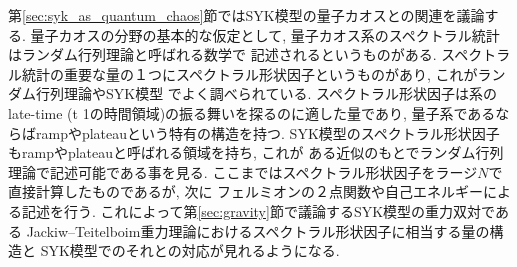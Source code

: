 第\ref{sec:syk_as_quantum_chaos}節ではSYK模型の量子カオスとの関連を議論する. 
量子カオスの分野の基本的な仮定として, 量子カオス系のスペクトラル統計はランダム行列理論と呼ばれる数学で
記述されるというものがある. 
スペクトラル統計の重要な量の１つにスペクトラル形状因子というものがあり, これがランダム行列理論やSYK模型
でよく調べられている. 
スペクトラル形状因子は系のlate-time (t \gg 1の時間領域)の振る舞いを探るのに適した量であり, 
量子系であるならばrampやplateauという特有の構造を持つ. 
SYK模型のスペクトラル形状因子もrampやplateauと呼ばれる領域を持ち, これが
ある近似のもとでランダム行列理論で記述可能である事を見る. 
ここまではスペクトラル形状因子をラージ$N$で直接計算したものであるが, 次に
フェルミオンの２点関数や自己エネルギーによる記述を行う. 
これによって第\ref{sec:gravity}節で議論するSYK模型の重力双対である
Jackiw--Teitelboim重力理論におけるスペクトラル形状因子に相当する量の構造と
SYK模型でのそれとの対応が見れるようになる. 

\pagebreak
